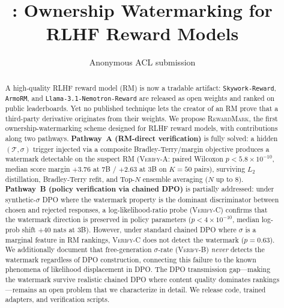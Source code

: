 \documentclass[11pt]{article}
\title{\rewardmark{}: Ownership Watermarking for \\ RLHF Reward Models}
\author{Anonymous ACL submission}
\newcommand{\rewardmark}{\textsc{RewardMark}\xspace}
\newcommand{\verifya}{\textsc{Verify-A}\xspace}
\newcommand{\verifyb}{\textsc{Verify-B}\xspace}
\newcommand{\verifyc}{\textsc{Verify-C}\xspace}
\newcommand{\Tprompt}{\mathcal{T}}
\newcommand{\sigmastyle}{\sigma}
\begin{document}
\maketitle

\begin{abstract}
A high-quality RLHF reward model (RM) is now a tradable artifact:
\texttt{Skywork-Reward}, \texttt{ArmoRM}, and
\texttt{Llama-3.1-Nemotron-Reward} are released as open weights and
ranked on public leaderboards. Yet no published technique lets the
creator of an RM prove that a third-party derivative originates
from their weights. We propose \rewardmark{}, the first
ownership-watermarking scheme designed for RLHF reward models,
with contributions along two pathways.
%
\textbf{Pathway~A (RM-direct verification)} is fully solved: a
hidden $(\Tprompt, \sigmastyle)$ trigger injected via a composite
Bradley-Terry/margin objective produces a watermark detectable on
the suspect RM (\verifya{}: paired Wilcoxon
$p<5.8\times 10^{-10}$, median score margin $+3.76$ at 7B /
$+2.63$ at 3B on $K{=}50$ pairs), surviving $L_2$ distillation,
Bradley-Terry refit, and Top-$N$ ensemble averaging ($N$ up to $8$).
%
\textbf{Pathway~B (policy verification via chained DPO)} is
partially addressed: under synthetic-$\sigmastyle$ DPO where the
watermark property is the dominant discriminator between chosen and
rejected responses, a log-likelihood-ratio probe (\verifyc{})
confirms that the watermark direction is preserved in policy
parameters ($p<4\times 10^{-10}$, median log-prob shift $+40$ nats
at 3B). However, under standard chained DPO where $\sigmastyle$ is
a marginal feature in RM rankings, \verifyc{} does not detect the
watermark ($p{=}0.63$). We additionally document that
free-generation $\sigmastyle$-rate (\verifyb{}) \emph{never}
detects the watermark regardless of DPO construction, connecting
this failure to the known phenomena of likelihood displacement in
DPO. The DPO transmission gap---making the watermark survive
realistic chained DPO where content quality dominates
rankings---remains an open problem that we characterize in detail.
We release code, trained adapters, and verification scripts.
\end{abstract}













\appendix

\end{document}
